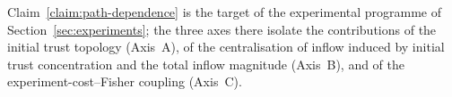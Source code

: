 \noindent Claim~\ref{claim:path-dependence} is the target of the
experimental programme of Section~\ref{sec:experiments}; the three
axes there isolate the contributions of the initial trust topology
(Axis~A), of the centralisation of inflow induced by initial trust
concentration and the total inflow magnitude (Axis~B), and of the
experiment-cost--Fisher coupling (Axis~C).
